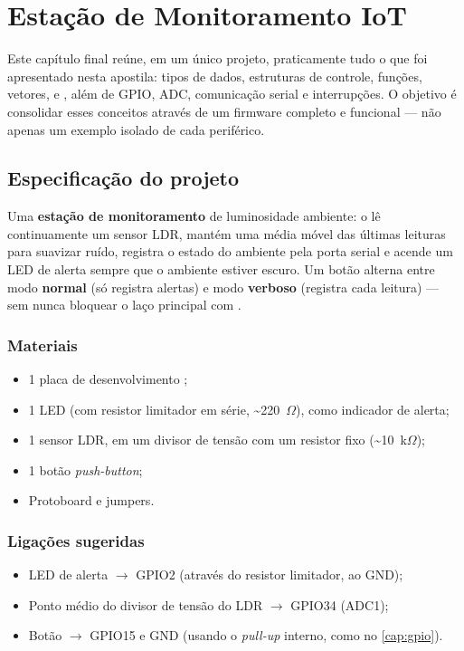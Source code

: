 \chapter{Estação de Monitoramento IoT}
\label{cap:projeto-final}

Este capítulo final reúne, em um único projeto, praticamente tudo o que foi apresentado nesta apostila: tipos de dados, estruturas de controle, funções, vetores,  e , além de GPIO, ADC, comunicação serial e interrupções. O objetivo é consolidar esses conceitos através de um firmware completo e funcional — não apenas um exemplo isolado de cada periférico.

\section{Especificação do projeto}

Uma \textbf{estação de monitoramento} de luminosidade ambiente: o \ESP{} lê continuamente um sensor LDR, mantém uma média móvel das últimas leituras para suavizar ruído, registra o estado do ambiente pela porta serial e acende um LED de alerta sempre que o ambiente estiver escuro. Um botão alterna entre modo \textbf{normal} (só registra alertas) e modo \textbf{verboso} (registra cada leitura) — sem nunca bloquear o laço principal com .

\subsection{Materiais}

\begin{itemize}
    \item 1 placa de desenvolvimento \ESP{};
    \item 1 LED (com resistor limitador em série, \textasciitilde220~$\Omega$), como indicador de alerta;
    \item 1 sensor LDR, em um divisor de tensão com um resistor fixo (\textasciitilde10~k$\Omega$);
    \item 1 botão \emph{push-button};
    \item Protoboard e jumpers.
\end{itemize}

\subsection{Ligações sugeridas}

\begin{itemize}
    \item LED de alerta $\rightarrow$ GPIO2 (através do resistor limitador, ao GND);
    \item Ponto médio do divisor de tensão do LDR $\rightarrow$ GPIO34 (ADC1);
    \item Botão $\rightarrow$ GPIO15 e GND (usando o \emph{pull-up} interno, como no \cref{cap:gpio}).
\end{itemize}

